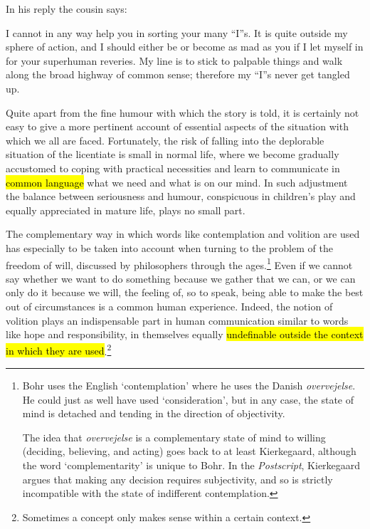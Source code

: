 \documentclass{tufte-handout}
\begin{document}
In his reply the cousin says:

I cannot in any way help you in sorting your many ``I''s. It is quite
outside my sphere of action, and I should either be or become as mad
as you if I let myself in for your superhuman reveries. My line is to
stick to palpable things and walk along the broad highway of common
sense; therefore my ``I''s never get tangled up.

Quite apart from the fine humour with which the story is told, it is
certainly not easy to give a more pertinent account of essential
aspects of the situation with which we all are faced. Fortunately, the
risk of falling into the deplorable situation of the licentiate is
small in normal life, where we become gradually accustomed to coping
with practical necessities and learn to communicate in \hl{common
  language} what we need and what is on our mind. In such adjustment
the balance between seriousness and humour, conspicuous in children’s
play and equally appreciated in mature life, plays no small part.

The complementary way in which words like contemplation and volition
are used has especially to be taken into account when turning to the
problem of the freedom of will, discussed by philosophers through the
ages.\footnote{Bohr uses the English `contemplation' where he uses the
  Danish \emph{overvejelse}. He could just as well have used
  `consideration', but in any case, the state of mind is detached and
  tending in the direction of objectivity.

  The idea that \emph{overvejelse} is a complementary state of mind to
  willing (deciding, believing, and acting) goes back to at least
  Kierkegaard, although the word `complementarity' is unique to
  Bohr. In the \emph{Postscript}, Kierkegaard argues that making any
  decision requires subjectivity, and so is strictly incompatible with
  the state of indifferent contemplation.} Even if we cannot say
whether we want to do something because we gather that we can, or we
can only do it because we will, the feeling of, so to speak, being
able to make the best out of circumstances is a common human
experience. Indeed, the notion of volition plays an indispensable part
in human communication similar to words like hope and responsibility,
in themselves equally \hl{undefinable outside the context in which
  they are used}.\footnote{Sometimes a concept only makes sense within
  a certain context.}
\end{document}
